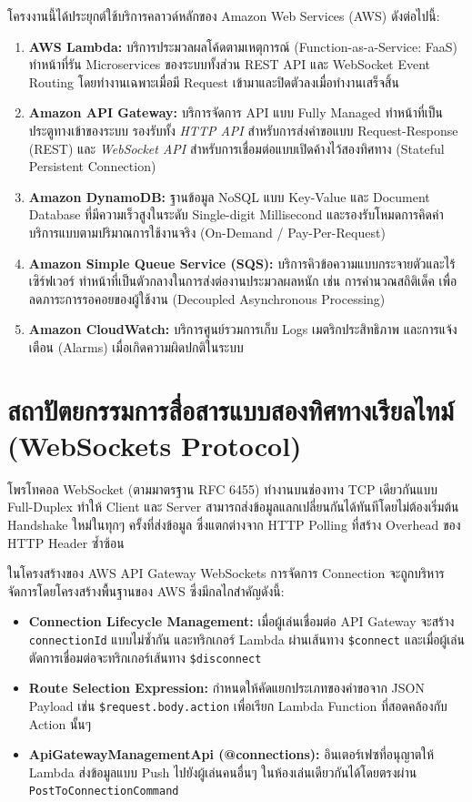 \documentclass[12pt,a4paper]{report}
\begin{document}
โครงงานนี้ได้ประยุกต์ใช้บริการคลาวด์หลักของ Amazon Web Services (AWS) ดังต่อไปนี้:
\begin{enumerate}
    \item \textbf{AWS Lambda:} บริการประมวลผลโค้ดตามเหตุการณ์ (Function-as-a-Service: FaaS) ทำหน้าที่รัน Microservices ของระบบทั้งส่วน REST API และ WebSocket Event Routing โดยทำงานเฉพาะเมื่อมี Request เข้ามาและปิดตัวลงเมื่อทำงานเสร็จสิ้น
    \item \textbf{Amazon API Gateway:} บริการจัดการ API แบบ Fully Managed ทำหน้าที่เป็นประตูทางเข้าของระบบ รองรับทั้ง \textit{HTTP API} สำหรับการส่งคำขอแบบ Request-Response (REST) และ \textit{WebSocket API} สำหรับการเชื่อมต่อแบบเปิดค้างไว้สองทิศทาง (Stateful Persistent Connection)
    \item \textbf{Amazon DynamoDB:} ฐานข้อมูล NoSQL แบบ Key-Value และ Document Database ที่มีความเร็วสูงในระดับ Single-digit Millisecond และรองรับโหมดการคิดค่าบริการแบบตามปริมาณการใช้งานจริง (On-Demand / Pay-Per-Request)
    \item \textbf{Amazon Simple Queue Service (SQS):} บริการคิวข้อความแบบกระจายตัวและไร้เซิร์ฟเวอร์ ทำหน้าที่เป็นตัวกลางในการส่งต่องานประมวลผลหนัก เช่น การคำนวณสถิติเด็ค เพื่อลดภาระการรอคอยของผู้ใช้งาน (Decoupled Asynchronous Processing)
    \item \textbf{Amazon CloudWatch:} บริการศูนย์รวมการเก็บ Logs เมตริกประสิทธิภาพ และการแจ้งเตือน (Alarms) เมื่อเกิดความผิดปกติในระบบ
\end{enumerate}

\section{สถาปัตยกรรมการสื่อสารแบบสองทิศทางเรียลไทม์ (WebSockets Protocol)}
โพรโทคอล WebSocket (ตามมาตรฐาน RFC 6455) ทำงานบนช่องทาง TCP เดียวกันแบบ Full-Duplex ทำให้ Client และ Server สามารถส่งข้อมูลแลกเปลี่ยนกันได้ทันทีโดยไม่ต้องเริ่มต้น Handshake ใหม่ในทุกๆ ครั้งที่ส่งข้อมูล ซึ่งแตกต่างจาก HTTP Polling ที่สร้าง Overhead ของ HTTP Header ซ้ำซ้อน

ในโครงสร้างของ AWS API Gateway WebSockets การจัดการ Connection จะถูกบริหารจัดการโดยโครงสร้างพื้นฐานของ AWS ซึ่งมีกลไกสำคัญดังนี้:
\begin{itemize}
    \item \textbf{Connection Lifecycle Management:} เมื่อผู้เล่นเชื่อมต่อ API Gateway จะสร้าง \texttt{connectionId} แบบไม่ซ้ำกัน และทริกเกอร์ Lambda ผ่านเส้นทาง \texttt{\$connect} และเมื่อผู้เล่นตัดการเชื่อมต่อจะทริกเกอร์เส้นทาง \texttt{\$disconnect}
    \item \textbf{Route Selection Expression:} กำหนดให้คัดแยกประเภทของคำขอจาก JSON Payload เช่น \texttt{\$request.body.action} เพื่อเรียก Lambda Function ที่สอดคล้องกับ Action นั้นๆ
    \item \textbf{ApiGatewayManagementApi (@connections):} อินเตอร์เฟซที่อนุญาตให้ Lambda ส่งข้อมูลแบบ Push ไปยังผู้เล่นคนอื่นๆ ในห้องเล่นเดียวกันได้โดยตรงผ่าน \texttt{PostToConnectionCommand}
\end{itemize}
\end{document}
